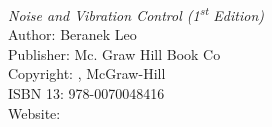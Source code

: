 
\begin{thebibliography}{9}




\emph{Noise and Vibration Control (1\textsuperscript{st} Edition)}\\
Author: Beranek Leo \\
Publisher: Mc. Graw Hill Book Co \\
Copyright: \textcopyright {}, McGraw-Hill\\
ISBN 13: 978-0070048416\\
Website: \\






\end{thebibliography}